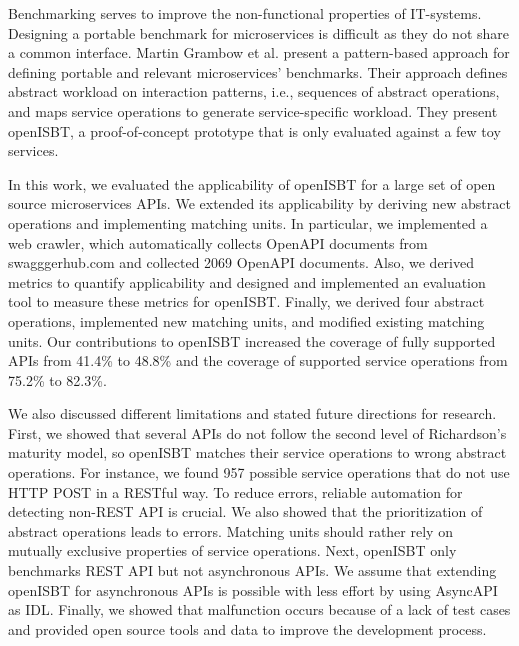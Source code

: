 

Benchmarking serves to improve the non-functional properties of IT-systems. Designing a portable benchmark for microservices is difficult as they do not share a common interface. Martin  Grambow et al. present a pattern-based approach for defining portable and relevant microservices' benchmarks. Their approach defines abstract workload on interaction patterns, i.e., sequences of abstract operations, and maps service operations to generate service-specific workload. They present openISBT, a proof-of-concept prototype that is only evaluated against a few toy services. 

In this work, we evaluated the applicability of openISBT for a large set of open source microservices APIs. We extended its applicability by deriving new abstract operations and implementing matching units. In particular, we implemented a web crawler, which automatically collects OpenAPI documents from swagggerhub.com and collected 2069 OpenAPI documents. 
Also, we derived metrics to quantify applicability and designed and implemented an evaluation tool to measure these metrics for openISBT. Finally, we derived four abstract operations, implemented new matching units, and modified existing matching units. Our contributions to openISBT increased the coverage of fully supported APIs from 41.4\% to 48.8\% and the coverage of supported service operations from 75.2\% to 82.3\%. 

We also discussed different limitations and stated future directions for research. First, we showed that several APIs do not follow the second level of Richardson's maturity model, so openISBT matches their service operations to wrong abstract operations. For instance, we found 957 possible service operations that do not use HTTP POST in a RESTful way. To reduce errors, reliable automation for detecting non-REST API is crucial. We also showed that the prioritization of abstract operations leads to errors. Matching units should rather rely on mutually exclusive properties of service operations. Next, openISBT only benchmarks REST API but not asynchronous APIs. We assume that extending openISBT for asynchronous APIs is possible with less effort by using AsyncAPI as IDL. Finally, we showed that malfunction occurs because of a lack of test cases and provided open source tools and data to improve the development process.